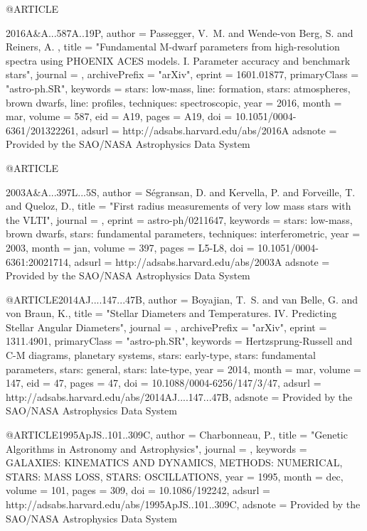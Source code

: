 
@ARTICLE{2016A&A...587A..19P,
   author = {{Passegger}, V.~M. and {Wende-von Berg}, S. and {Reiners}, A.
	},
    title = "{Fundamental M-dwarf parameters from high-resolution spectra using PHOENIX ACES models. I. Parameter accuracy and benchmark stars}",
  journal = {\aap},
archivePrefix = "arXiv",
   eprint = {1601.01877},
 primaryClass = "astro-ph.SR",
 keywords = {stars: low-mass, line: formation, stars: atmospheres, brown dwarfs, line: profiles, techniques: spectroscopic},
     year = 2016,
    month = mar,
   volume = 587,
      eid = {A19},
    pages = {A19},
      doi = {10.1051/0004-6361/201322261},
   adsurl = {http://adsabs.harvard.edu/abs/2016A%
  adsnote = {Provided by the SAO/NASA Astrophysics Data System}
}

@ARTICLE{2003A&A...397L...5S,
   author = {{S{\'e}gransan}, D. and {Kervella}, P. and {Forveille}, T. and 
	{Queloz}, D.},
    title = "{First radius measurements of very low mass stars with the VLTI}",
  journal = {\aap},
   eprint = {astro-ph/0211647},
 keywords = {stars: low-mass, brown dwarfs, stars: fundamental parameters, techniques: interferometric},
     year = 2003,
    month = jan,
   volume = 397,
    pages = {L5-L8},
      doi = {10.1051/0004-6361:20021714},
   adsurl = {http://adsabs.harvard.edu/abs/2003A%
  adsnote = {Provided by the SAO/NASA Astrophysics Data System}
}

   @ARTICLE{2014AJ....147...47B,
   author = {{Boyajian}, T.~S. and {van Belle}, G. and {von Braun}, K.},
    title = "{Stellar Diameters and Temperatures. IV. Predicting Stellar Angular Diameters}",
  journal = {\aj},
archivePrefix = "arXiv",
   eprint = {1311.4901},
 primaryClass = "astro-ph.SR",
 keywords = {Hertzsprung-Russell and C-M diagrams, planetary systems, stars: early-type, stars: fundamental parameters, stars: general, stars: late-type},
     year = 2014,
    month = mar,
   volume = 147,
      eid = {47},
    pages = {47},
      doi = {10.1088/0004-6256/147/3/47},
   adsurl = {http://adsabs.harvard.edu/abs/2014AJ....147...47B},
  adsnote = {Provided by the SAO/NASA Astrophysics Data System}
}


@ARTICLE{1995ApJS..101..309C,
   author = {{Charbonneau}, P.},
    title = "{Genetic Algorithms in Astronomy and Astrophysics}",
  journal = {\apjs},
 keywords = {GALAXIES: KINEMATICS AND DYNAMICS, METHODS: NUMERICAL, STARS: MASS LOSS, STARS: OSCILLATIONS},
     year = 1995,
    month = dec,
   volume = 101,
    pages = {309},
      doi = {10.1086/192242},
   adsurl = {http://adsabs.harvard.edu/abs/1995ApJS..101..309C},
  adsnote = {Provided by the SAO/NASA Astrophysics Data System}
}

}}
